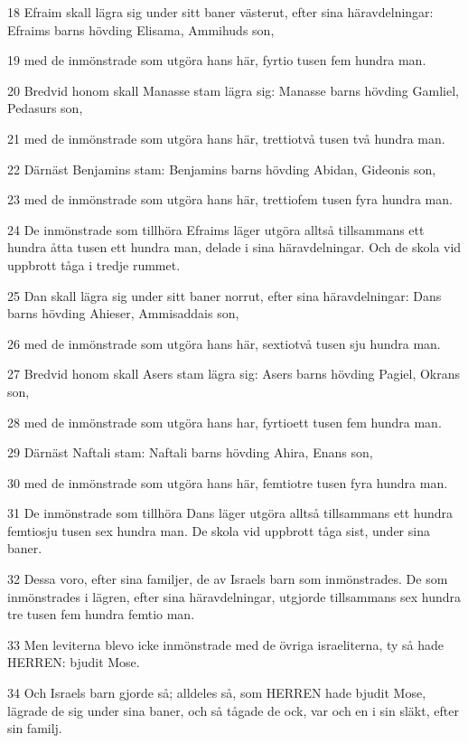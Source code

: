 \par 18 Efraim skall lägra sig under sitt baner västerut, efter sina häravdelningar: Efraims barns hövding Elisama, Ammihuds son,
\par 19 med de inmönstrade som utgöra hans här, fyrtio tusen fem hundra man.
\par 20 Bredvid honom skall Manasse stam lägra sig: Manasse barns hövding Gamliel, Pedasurs son,
\par 21 med de inmönstrade som utgöra hans här, trettiotvå tusen två hundra man.
\par 22 Därnäst Benjamins stam: Benjamins barns hövding Abidan, Gideonis son,
\par 23 med de inmönstrade som utgöra hans här, trettiofem tusen fyra hundra man.
\par 24 De inmönstrade som tillhöra Efraims läger utgöra alltså tillsammans ett hundra åtta tusen ett hundra man, delade i sina häravdelningar. Och de skola vid uppbrott tåga i tredje rummet.
\par 25 Dan skall lägra sig under sitt baner norrut, efter sina häravdelningar: Dans barns hövding Ahieser, Ammisaddais son,
\par 26 med de inmönstrade som utgöra hans här, sextiotvå tusen sju hundra man.
\par 27 Bredvid honom skall Asers stam lägra sig: Asers barns hövding Pagiel, Okrans son,
\par 28 med de inmönstrade som utgöra hans har, fyrtioett tusen fem hundra man.
\par 29 Därnäst Naftali stam: Naftali barns hövding Ahira, Enans son,
\par 30 med de inmönstrade som utgöra hans här, femtiotre tusen fyra hundra man.
\par 31 De inmönstrade som tillhöra Dans läger utgöra alltså tillsammans ett hundra femtiosju tusen sex hundra man. De skola vid uppbrott tåga sist, under sina baner.
\par 32 Dessa voro, efter sina familjer, de av Israels barn som inmönstrades. De som inmönstrades i lägren, efter sina häravdelningar, utgjorde tillsammans sex hundra tre tusen fem hundra femtio man.
\par 33 Men leviterna blevo icke inmönstrade med de övriga israeliterna, ty så hade HERREN: bjudit Mose.
\par 34 Och Israels barn gjorde så; alldeles så, som HERREN hade bjudit Mose, lägrade de sig under sina baner, och så tågade de ock, var och en i sin släkt, efter sin familj.

